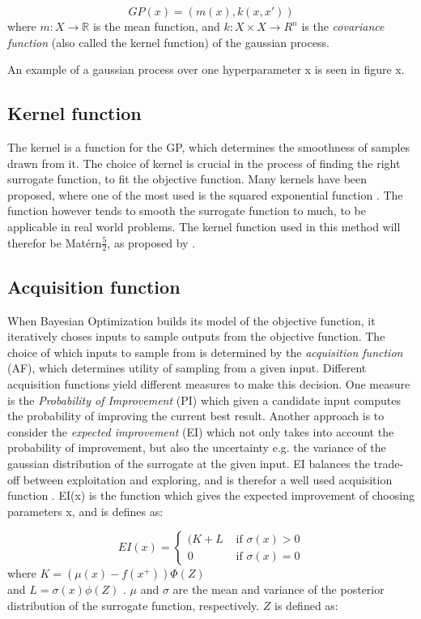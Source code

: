 \begin{equation}\label{gaussian-process}
GP(x) = (m(x), k(x, x'))
\end{equation}
where $m : X \rightarrow \mathbb{R}$ is the mean function, and $k : X \times X \rightarrow R^n$ is the \emph{covariance function} (also called the kernel function) of the gaussian process.

An example of a gaussian process over one hyperparameter x is seen in figure x. 

\subsection{Kernel function}
The kernel is a function for the GP, which determines the smoothness of samples drawn from it. The choice of kernel is crucial in the process of finding the right surrogate function, to fit the objective function. Many kernels have been proposed, where one of the most used is the squared exponential function \citet{brochu2010tutorial}. The function however tends to smooth the surrogate function to much, to be applicable in real world problems. The kernel function used in this method will therefor be Matérn$\frac{5}{2}$, as proposed by \citet{snoek2012practical}.

\subsection{Acquisition function}
When Bayesian Optimization builds its model of the objective function, it iteratively choses inputs to sample outputs from the objective function. The choice of which inputs to sample from is determined by the \emph{acquisition function} (AF), which determines utility of sampling from a given input. Different acquisition functions yield different measures to make this decision. One measure is the \emph{Probability of Improvement} (PI) which given a candidate input computes the probability of improving the current best result.  Another approach is to consider the \emph{expected improvement} (EI) which not only takes into account the probability of improvement, but also the uncertainty e.g. the variance of the gaussian distribution of the surrogate at the given input.
EI balances the trade-off between exploitation and exploring, and is therefor a well used acquisition function \citet{brochu2010tutorial}. EI(x) is the function which gives the expected improvement of choosing parameters x, and is defines as:

\begin{equation}
\label{eq:expected-improvement}
EI(x) =
\begin{cases}
   (K + L & \text{ if } \sigma(x) > 0\\
   0 	  & \text{ if } \sigma(x) = 0
\end{cases}
\end{equation}
where $K = (\mu(x) - f(x^+))\Phi(Z)$ \\and $L = \sigma(x)\phi(Z)$ .
$\mu$ and $\sigma$ are the mean and variance of the posterior distribution of the surrogate function, respectively. $Z$ is defined as:


